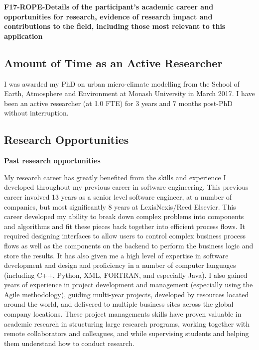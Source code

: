 \noindent \textbf{F17-ROPE-Details of the participant's academic career and opportunities for research, evidence of research impact and contributions to the field, including those most relevant to this application }\\ \noindent 





\subsection*{\TitleFont Amount of Time as an Active Researcher}

I was awarded my PhD on urban micro-climate modelling from the School of Earth, Atmosphere and Environment at Monash University in March 2017. I have been an active researcher (at 1.0 FTE) for 3 years and 7 months post-PhD without interruption.

\subsection*{\TitleFont Research Opportunities}

\textbf{Past research opportunities}

My research career has greatly benefited from the skills and experience I developed throughout my previous career in software engineering. This previous career involved 13 years as a senior level software engineer, at a number of companies, but most significantly 8 years at LexisNexis/Reed Elsevier. This career developed my ability to break down complex problems into components and algorithms and fit these pieces back together into efficient process flows. It required designing interfaces to allow users to control complex business process flows as well as the components on the backend to perform the business logic and store the results. It has also given me a high level of expertise in software development and design and proficiency in a number of computer languages (including C++, Python, XML, FORTRAN, and especially Java). I also gained years of experience in project development and management (especially using the Agile methodology), guiding multi-year projects, developed by resources located around the world, and delivered to multiple business sites across the global company locations. These project managements skills have proven valuable in academic research in structuring large research programs, working together with remote collaborators and colleagues, and while supervising students and helping them understand how to conduct research.

